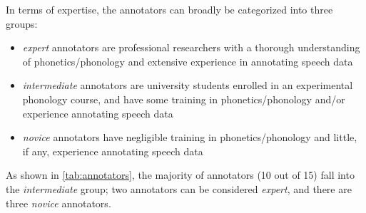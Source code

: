 	In terms of expertise, the annotators can broadly be categorized into three groups: 
	\begin{itemize}[itemsep=0pt, topsep=-1em, partopsep=0pt]
	\item{\textit{expert} annotators are professional researchers with a thorough understanding of phonetics/phonology and extensive experience in annotating speech data}
	\item{\textit{intermediate} annotators are university students enrolled in an experimental phonology course,
	and have some training in phonetics/phonology and/or experience annotating speech data}
	\item{\textit{novice} annotators have negligible training in phonetics/phonology and little, if any, experience annotating speech data}
	\end{itemize}
	As shown in \cref{tab:annotators}, the majority of annotators (10 out of 15) fall into the \textit{intermediate} group; two annotators can be considered \textit{expert}, and there are three \textit{novice} annotators.
	

